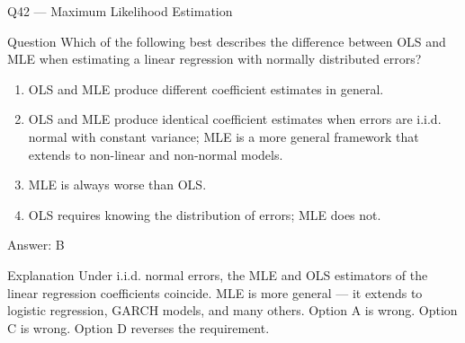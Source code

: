 \documentclass[aspectratio=169,8pt]{beamer}
\begin{document}
	\begin{frame}{Q42 --- Maximum Likelihood Estimation}
		\begin{block}{Question}
			Which of the following best describes the difference between OLS and MLE when estimating a linear regression with normally distributed errors?
		\end{block}
		\begin{enumerate}
			\item OLS and MLE produce different coefficient estimates in general.
			\item OLS and MLE produce identical coefficient estimates when errors are i.i.d. normal with constant variance; MLE is a more general framework that extends to non-linear and non-normal models.
			\item MLE is always worse than OLS.
			\item OLS requires knowing the distribution of errors; MLE does not.
		\end{enumerate}
		\begin{exampleblock}{Answer: B}\end{exampleblock}
		\begin{block}{Explanation}
			Under i.i.d. normal errors, the MLE and OLS estimators of the linear regression coefficients coincide. MLE is more general --- it extends to logistic regression, GARCH models, and many others. Option A is wrong. Option C is wrong. Option D reverses the requirement.
		\end{block}
	\end{frame}
	
\end{document}
